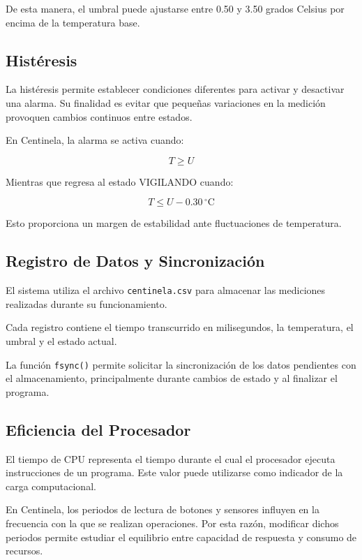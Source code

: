 \documentclass[conference]{IEEEtran}
\begin{document}
De esta manera, el umbral puede ajustarse entre 0.50 y 3.50 grados Celsius por encima de la temperatura base.

\subsection{Histéresis}

La histéresis permite establecer condiciones diferentes para activar y desactivar una alarma. Su finalidad es evitar que pequeñas variaciones en la medición provoquen cambios continuos entre estados.

En Centinela, la alarma se activa cuando:

\begin{equation}
T \geq U
\end{equation}

Mientras que regresa al estado VIGILANDO cuando:

\begin{equation}
T \leq U - 0.30\,^{\circ}\mathrm{C}
\end{equation}

Esto proporciona un margen de estabilidad ante fluctuaciones de temperatura.

\subsection{Registro de Datos y Sincronización}

El sistema utiliza el archivo \texttt{centinela.csv} para almacenar las mediciones realizadas durante su funcionamiento.

Cada registro contiene el tiempo transcurrido en milisegundos, la temperatura, el umbral y el estado actual.

La función \texttt{fsync()} permite solicitar la sincronización de los datos pendientes con el almacenamiento, principalmente durante cambios de estado y al finalizar el programa.

\subsection{Eficiencia del Procesador}

El tiempo de CPU representa el tiempo durante el cual el procesador ejecuta instrucciones de un programa. Este valor puede utilizarse como indicador de la carga computacional.

En Centinela, los periodos de lectura de botones y sensores influyen en la frecuencia con la que se realizan operaciones. Por esta razón, modificar dichos periodos permite estudiar el equilibrio entre capacidad de respuesta y consumo de recursos.
\end{document}
